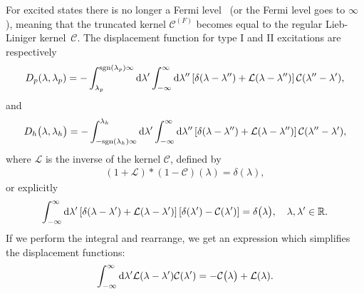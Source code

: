 \documentclass[11pt, a4paper]{report} %
\begin{document}
For excited states there is no longer a Fermi level~\cite{Caux2015} (or the Fermi level goes to \(\infty\)), meaning that the truncated kernel \(\mathcal{C}^{(F)}\) becomes equal to the regular Lieb-Liniger kernel~\(\mathcal{C}\).
The displacement function for type I and II excitations are respectively~\cite{Caux2015}
\begin{align}
	D_p\qty(\lambda, \lambda_p) = - \int_{\lambda_p}^{\textrm{sgn}\qty(\lambda_p)\infty} \dd \lambda' \int_{-\infty}^{\infty} \dd  \lambda'' \left[\delta\qty(\lambda-\lambda'') + \mathcal{L}\qty(\lambda-\lambda'') \right]\mathcal{C}\qty(\lambda''-\lambda'),
\end{align}
and
\begin{align}
	D_h\qty\big(\lambda, \lambda_h) = - \int_{-\textrm{sgn}(\lambda_h)\infty}^{\lambda_h} \dd \lambda' \int_{-\infty}^{\infty} \dd \lambda'' \left[\delta\qty(\lambda-\lambda'') + \mathcal{L}\qty(\lambda - \lambda'') \right]\mathcal{C}\qty(\lambda''-\lambda'),
\end{align}
where \(\mathcal{L}\) is the inverse of the kernel \(\mathcal{C}\), defined by~\cite{Yang1969}
\begin{align}
	(1+\mathcal{L})*(1-\mathcal{C})(\lambda) = \delta(\lambda),
\end{align}
or explicitly
\begin{align}
	\int_{-\infty}^{\infty} \dd \lambda' \left[ \delta\qty(\lambda-\lambda') + \mathcal{L}\qty(\lambda-\lambda') \right] \left[ \delta\qty(\lambda') - \mathcal{C}\qty(\lambda')\right] = \delta\qty\big(\lambda), \quad \lambda, \lambda' \in \mathbb{R}.
\end{align}
If we perform the integral and rearrange, we get an expression which simplifies the displacement functions:
\begin{align}\label{eq:kernelinversion}
	\int_{-\infty}^{\infty} \dd \lambda' \mathcal{L}\qty(\lambda-\lambda') \mathcal{C}\qty(\lambda') = -\mathcal{C}\qty\big(\lambda) + \mathcal{L}\qty(\lambda).
\end{align}
\end{document}
